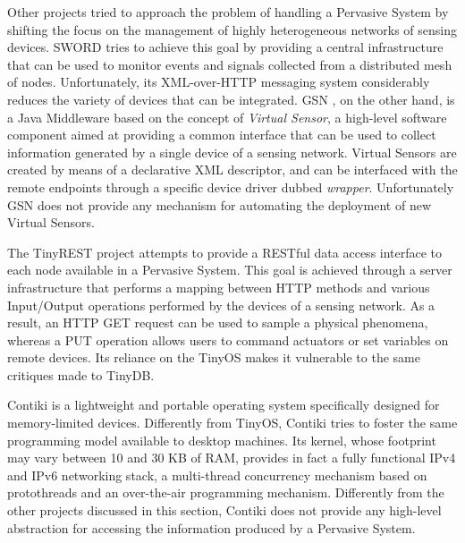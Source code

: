 Other projects tried to approach the problem of handling a Pervasive System by
shifting the focus on the management of highly heterogeneous networks of
sensing devices. SWORD \cite{sword} tries to achieve this goal by providing a
central infrastructure that can be used to monitor events and signals collected
from a distributed mesh of nodes. Unfortunately, its XML-over-HTTP messaging
system considerably reduces the variety of devices that can be integrated. GSN
\cite{aberer2006global}, on the other hand, is a Java Middleware based on the
concept of \textit{Virtual Sensor}, a high-level software component aimed at
providing a common interface that can be used to collect information generated
by a single device of a sensing network. Virtual Sensors are created by means
of a declarative XML descriptor, and can be interfaced with the remote
endpoints through a specific device driver dubbed \textit{wrapper}.
Unfortunately GSN does not provide any mechanism for automating the deployment
of new Virtual Sensors.

The TinyREST \cite{luckenbach2005tinyrest} project attempts to provide a
RESTful \cite{fielding2000architectural} data access interface to each node
available in a Pervasive System. This goal is achieved through a server
infrastructure that performs a mapping between HTTP methods and various
Input/Output operations performed by the devices of a sensing network. As a
result, an HTTP GET request can be used to sample a physical phenomena, whereas
a PUT operation allows users to command actuators or set variables on remote
devices. Its reliance on the TinyOS makes it vulnerable to the same critiques
made to TinyDB.

Contiki \cite{dunkels2004contiki} is a lightweight and portable operating
system specifically designed for memory-limited devices. Differently from
TinyOS, Contiki tries to foster the same programming model available to desktop
machines. Its kernel, whose footprint may vary between 10 and 30 KB of RAM,
provides in fact a fully functional IPv4 and IPv6 networking stack, a
multi-thread concurrency mechanism based on protothreads and an over-the-air
programming mechanism. Differently from the other projects discussed in this
section, Contiki does not provide any high-level abstraction for accessing the
information produced by a Pervasive System.
